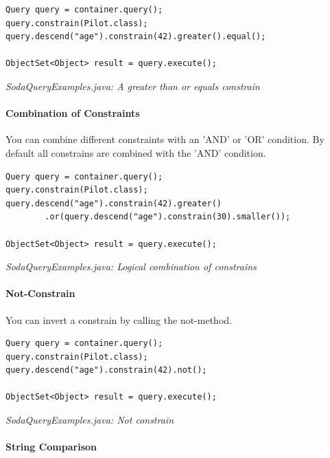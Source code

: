 \begin{lstlisting}
Query query = container.query();
query.constrain(Pilot.class);
query.descend("age").constrain(42).greater().equal();

ObjectSet<Object> result = query.execute();
\end{lstlisting}

{\small\itshape SodaQueryExamples.java: A greater than or equals constrain\par}
\medskip

\paragraph{Combination of Constraints}
\label{ref:basics-querying-soda-soda-example-catelog:combination}

You can combine different constraints with an 'AND' or 'OR' condition. By default all constrains are combined with the 'AND' condition.

\begin{lstlisting}
Query query = container.query();
query.constrain(Pilot.class);
query.descend("age").constrain(42).greater()
        .or(query.descend("age").constrain(30).smaller());

ObjectSet<Object> result = query.execute();
\end{lstlisting}

{\small\itshape SodaQueryExamples.java: Logical combination of constrains\par}
\medskip

\paragraph*{Not-Constrain}

You can invert a constrain by calling the not-method.

\begin{lstlisting}
Query query = container.query();
query.constrain(Pilot.class);
query.descend("age").constrain(42).not();

ObjectSet<Object> result = query.execute();
\end{lstlisting}

{\small\itshape SodaQueryExamples.java: Not constrain\par}
\medskip

\paragraph{String Comparison}
\label{ref:basics-querying-soda-soda-example-catelog:stringcomparison}

